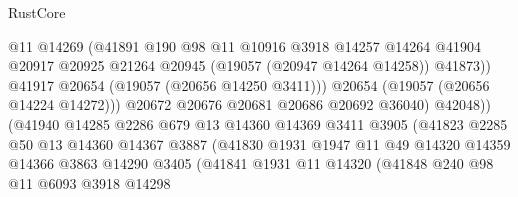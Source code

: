 \begin{lexlean}{RustCore}
\begin{coremodule}
                                    @11
                                    @14269
                                    (@41891
                                      @190
                                      @98
                                      @11
                                      @10916
                                      @3918
                                      @14257
                                      @14264
                                      @41904
                                      @20917
                                      @20925
                                      @21264
                                      @20945
                                      (@19057 (@20947 @14264 @14258))
                                      @41873))
                                  @41917
                                  @20654
                                  (@19057 (@20656 @14250 @3411)))
                                @20654
                                (@19057 (@20656 @14224 @14272)))
                              @20672
                              @20676
                              @20681
                              @20686
                              @20692
                              @36040)
                            @42048))
                        (@41940
                          @14285
                          @2286
                          @679
                          @13
                          @14360
                          @14369
                          @3411
                          @3905
                          (@41823
                            @2285
                            @50
                            @13
                            @14360
                            @14367
                            @3887
                            (@41830
                              @1931
                              @1947
                              @11
                              @49
                              @14320
                              @14359
                              @14366
                              @3863
                              @14290
                              @3405
                              (@41841
                                @1931
                                @11
                                @14320
                                (@41848
                                  @240
                                  @98
                                  @11
                                  @6093
                                  @3918
                                  @14298

\end{coremodule}
\end{lexlean}
